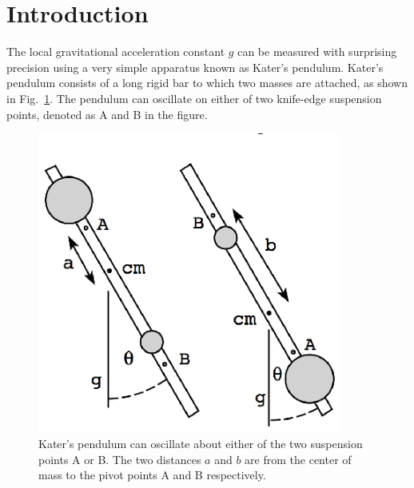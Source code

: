 \documentclass{revtex4}
\begin{document}
\section{Introduction}

The local gravitational acceleration constant $g$ can be measured with
surprising precision using a very simple apparatus known as
Kater's pendulum\cite{Symon71,Kleppner73,Marion95}.
Kater's pendulum consists of
a long rigid bar to which two masses are attached, as shown in
Fig.~\ref{katersfig}.  The pendulum can oscillate on either of two
knife-edge suspension points, denoted as A and B in the figure.

\begin{figure}
\includegraphics[width=10cm]{katersfig.eps}
\caption{\label{katersfig} 
Kater's pendulum can oscillate about either of the two suspension points
A or B. The two distances $a$ and $b$ are from the center of mass
to the pivot points A and B respectively.}
\end{figure}
\end{document}
